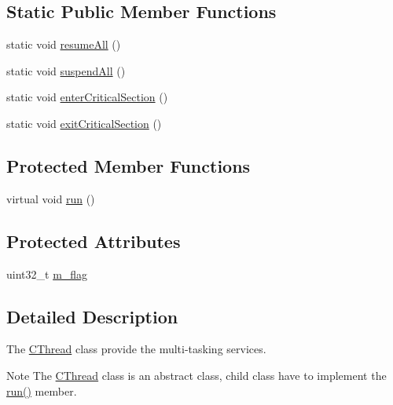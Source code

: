 \subsection*{Static Public Member Functions}
\begin{DoxyCompactItemize}
\item 
static void \hyperlink{class_c_thread_a743d4325b7e7da494283f3292773ff77}{resume\-All} ()
\item 
static void \hyperlink{class_c_thread_a2c09328581bd4e4a3e9e793f3376a92a}{suspend\-All} ()
\item 
static void \hyperlink{class_c_thread_aeb4cafe42d6cfc41294cf5dedcee8678}{enter\-Critical\-Section} ()
\item 
static void \hyperlink{class_c_thread_aab3a51062666552690be49b8e8027161}{exit\-Critical\-Section} ()
\end{DoxyCompactItemize}
\subsection*{Protected Member Functions}
\begin{DoxyCompactItemize}
\item 
virtual void \hyperlink{class_c_thread_a071c3d3b3c19a7bd6a01aca073a9b4d7}{run} ()
\end{DoxyCompactItemize}
\subsection*{Protected Attributes}
\begin{DoxyCompactItemize}
\item 
uint32\-\_\-t \hyperlink{class_c_thread_a2723c18f3f7659cdd93610fd1654d564}{m\-\_\-flag}
\end{DoxyCompactItemize}


\subsection{Detailed Description}
The \hyperlink{class_c_thread}{C\-Thread} class provide the multi-\/tasking services. \begin{DoxyNote}{Note}
The \hyperlink{class_c_thread}{C\-Thread} class is an abstract class, child class have to implement the \hyperlink{class_c_thread_a071c3d3b3c19a7bd6a01aca073a9b4d7}{run()} member. 
\end{DoxyNote}


